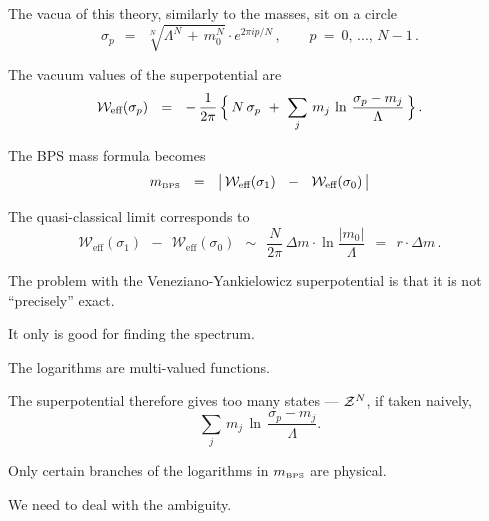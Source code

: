 \documentclass[12pt,letterpaper,landscape,KOMA,smallheadings,calcdimensions,display]{powersem}
\newcommand{\mbps}{m_{\text{\tiny BPS}}}
\newcommand{\W}{\mathcal{W}}
\begin{document}
\begin{slide}

	The vacua of this theory, similarly to the masses, sit on a circle
\[
	\sigma_p ~~=~~ \sqrt[N] { \Lambda^N \,+\, m_0^N } \cdot e^{ 2\pi i p / N }\,, \qquad p ~=~ 0,\,...,\, N-1\,.
\]

	The vacuum values of the superpotential are 
\[
	\W_\text{eff} ( \sigma_p ) ~~=~~ 
		-\, \frac{1}{2\pi}\,  
                \Bigl\{\, N\, \sigma_p ~+~ \sum_j\, m_j\, \ln \,\frac{\sigma_p - m_j}{\Lambda} \,\Bigr\}\,.
\]

	The BPS mass formula becomes
\[
	\mbps ~~=~~ \big|\, \W_\text{eff} ( \sigma_1 ) ~~-~~ \W_\text{eff} ( \sigma_0 ) \,\big| 
\]

	The quasi-classical limit corresponds to 
\[
	\W_\text{eff} ( \sigma_1 ) ~~-~~ \W_\text{eff} ( \sigma_0 ) ~~\sim~~
		\frac{N}{2\pi}\,
		\Delta m \cdot \ln \frac{| m_0 |}{\Lambda} ~~=~~  r \cdot \Delta m\,.
\]

\end{slide}


\begin{slide}
\vspace*{0.6cm}

	The problem with the Veneziano-Yankielowicz superpotential is that it is not ``precisely'' exact.

	It only is good for finding the spectrum.

	The logarithms are multi-valued functions.

	The superpotential therefore gives too many states --- $ \mathcal{Z}^N $, if taken naively,
\[
	\sum_j\, m_j\, \ln \,\frac{\sigma_p - m_j}{\Lambda}.
\]

	Only certain branches of the logarithms in $ \mbps $ are physical.

	We need to deal with the ambiguity. 

\end{slide}
\end{document}
